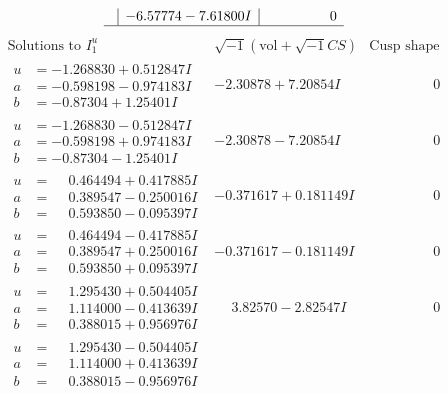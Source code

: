 \documentclass[1p]{elsarticle_modified}
\theoremstyle{definition}
\newcommand{\I}{\sqrt{-1}}
\begin{document}
$$\begin{array}{c|c|c}
 & -6.57774 - 7.61800 I & \phantom{-0.000000 } 0\\
 \hline 
 \end{array}$$\newpage$$\begin{array}{c|c|c}  
\text{Solutions to }I^u_{1}& \I (\text{vol} + \sqrt{-1}CS) & \text{Cusp shape}\\
 \hline 
\begin{aligned}
u &= -1.268830 + 0.512847 I \\
a &= -0.598198 - 0.974183 I \\
b &= -0.87304 + 1.25401 I\end{aligned}
 & -2.30878 + 7.20854 I & \phantom{-0.000000 } 0 \\ \hline\begin{aligned}
u &= -1.268830 - 0.512847 I \\
a &= -0.598198 + 0.974183 I \\
b &= -0.87304 - 1.25401 I\end{aligned}
 & -2.30878 - 7.20854 I & \phantom{-0.000000 } 0 \\ \hline\begin{aligned}
u &= \phantom{-}0.464494 + 0.417885 I \\
a &= \phantom{-}0.389547 - 0.250016 I \\
b &= \phantom{-}0.593850 - 0.095397 I\end{aligned}
 & -0.371617 + 0.181149 I & \phantom{-0.000000 } 0 \\ \hline\begin{aligned}
u &= \phantom{-}0.464494 - 0.417885 I \\
a &= \phantom{-}0.389547 + 0.250016 I \\
b &= \phantom{-}0.593850 + 0.095397 I\end{aligned}
 & -0.371617 - 0.181149 I & \phantom{-0.000000 } 0 \\ \hline\begin{aligned}
u &= \phantom{-}1.295430 + 0.504405 I \\
a &= \phantom{-}1.114000 - 0.413639 I \\
b &= \phantom{-}0.388015 + 0.956976 I\end{aligned}
 & \phantom{-}3.82570 - 2.82547 I & \phantom{-0.000000 } 0 \\ \hline\begin{aligned}
u &= \phantom{-}1.295430 - 0.504405 I \\
a &= \phantom{-}1.114000 + 0.413639 I \\
b &= \phantom{-}0.388015 - 0.956976 I\end{aligned}

\end{array}$$
\end{document}
